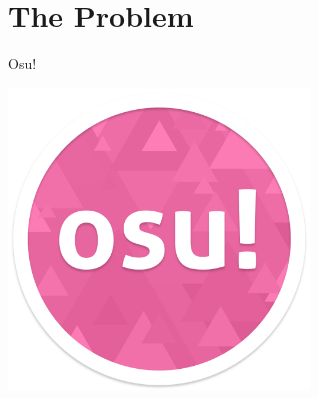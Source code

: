 \documentclass[table]{beamer}
\begin{document}
\section{The Problem}

\begin{frame}{Osu!}
  \begin{center}
    \includegraphics[width=0.60\textwidth]{images/osu-logo.png}
  \end{center}
\end{frame}
\end{document}
